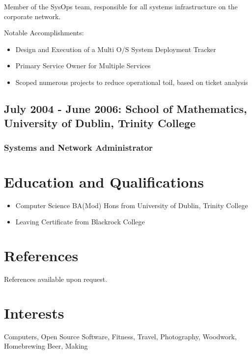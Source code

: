 \documentclass[a4paper, 10pt] {article}
\begin{document}
Member of the SysOps team, responsible for all systems infrastructure on the corporate network.

\vspace{5mm} %

Notable Accomplishments:

\begin{itemize}
  \item Design and Execution of a Multi O/S System Deployment Tracker
  \item Primary Service Owner for Multiple Services
  \item Scoped numerous projects to reduce operational toil, based on ticket analysis
\end{itemize}

\subsection*{July 2004 - June 2006: School of Mathematics, University of Dublin, Trinity College}

\subsubsection*{Systems and Network Administrator}

\section*{Education and Qualifications}

\begin{itemize}
  \item Computer Science BA(Mod) Hons from University of Dublin, Trinity College
  \item Leaving Certificate from Blackrock College
\end{itemize}

\section*{References}

References available upon request.

\section*{Interests}

Computers, Open Source Software, Fitness, Travel, Photography, Woodwork, Homebrewing Beer, Making
\end{document}
